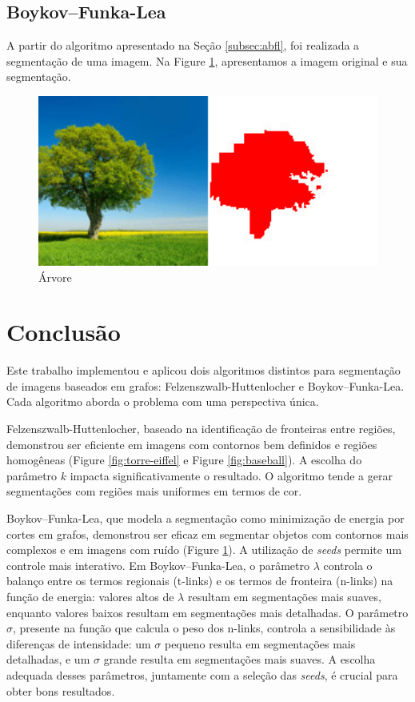\documentclass[12pt]{article}
\begin{document}
\subsection{Boykov--Funka-Lea}
A partir do algoritmo apresentado na Seção \ref{subsec:abfl}, foi realizada a segmentação de uma imagem. Na Figure \ref{fig:arvore}, apresentamos a imagem original e sua segmentação.

\begin{figure}[ht]
\centering
\includegraphics[width=1\textwidth]{arvore.png}
\caption{Árvore}
\label{fig:arvore}
\end{figure}

\section{Conclusão} \label{sec:conclusion}
Este trabalho implementou e aplicou dois algoritmos distintos para segmentação de imagens baseados em grafos: Felzenszwalb-Huttenlocher e Boykov--Funka-Lea. Cada algoritmo aborda o problema com uma perspectiva única.

Felzenszwalb-Huttenlocher, baseado na identificação de fronteiras entre regiões, demonstrou ser eficiente em imagens com contornos bem definidos e regiões homogêneas (Figure \ref{fig:torre-eiffel} e Figure \ref{fig:baseball}). A escolha do parâmetro $k$ impacta significativamente o resultado. O algoritmo tende a gerar segmentações com regiões mais uniformes em termos de cor.

Boykov--Funka-Lea, que modela a segmentação como minimização de energia por cortes em grafos, demonstrou ser eficaz em segmentar objetos com contornos mais complexos e em imagens com ruído (Figure \ref{fig:arvore}). A utilização de \textit{seeds} permite um controle mais interativo. Em Boykov--Funka-Lea, o parâmetro $\lambda$ controla o balanço entre os termos regionais (t-links) e os termos de fronteira (n-links) na função de energia: valores altos de $\lambda$ resultam em segmentações mais suaves, enquanto valores baixos resultam em segmentações mais detalhadas. O parâmetro $\sigma$, presente na função que calcula o peso dos n-links, controla a sensibilidade às diferenças de intensidade: um $\sigma$ pequeno resulta em segmentações mais detalhadas, e um $\sigma$ grande resulta em segmentações mais suaves. A escolha adequada desses parâmetros, juntamente com a seleção das \textit{seeds}, é crucial para obter bons resultados.
\end{document}
